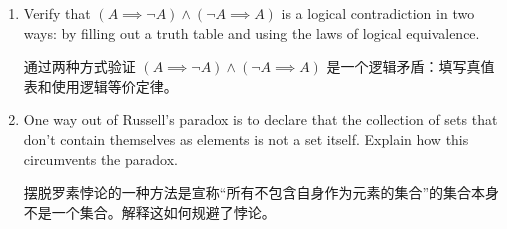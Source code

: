 \begin{enumerate}
    \item Verify that $(A \implies {\lnot}A) \land ({\lnot}A \implies A)$
    is a logical contradiction in two ways:  by filling out a truth table and 
    using the laws of logical equivalence.
    
    通过两种方式验证 $(A \implies {\lnot}A) \land ({\lnot}A \implies A)$ 是一个逻辑矛盾：填写真值表和使用逻辑等价定律。
    
    \wbvfill
     
     
    \item One way out of Russell's paradox is to declare that the collection
    of sets that don't contain themselves as elements is not a set itself.
    Explain how this circumvents the paradox. 
    
    摆脱罗素悖论的一种方法是宣称“所有不包含自身作为元素的集合”的集合本身不是一个集合。解释这如何规避了悖论。
    
    
    \wbvfill
     
     \workbookpagebreak
     
    \end{enumerate}
    
    
